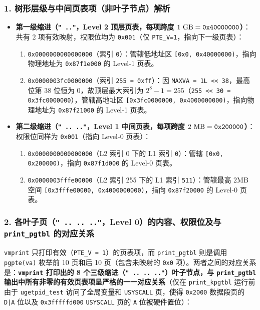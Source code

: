 \documentclass[12pt, a4paper]{ctexart}
\begin{document}
\subsubsection{1. 树形层级与中间页表项（非叶子节点）解析}
\begin{itemize}
    \item \textbf{第一级缩进（\texttt{" .."}，Level 2 顶层页表，每项跨度 $1\text{ GB} = \text{\texttt{0x40000000}}$）}：
    共有 2 项有效映射，权限位均为 \texttt{0x001}（仅 \texttt{PTE\_V=1}，指向下一级页表）：
    \begin{enumerate}
        \item \texttt{0x0000000000000000}（索引 \texttt{0}）：管辖低地址区 \texttt{[0x0, 0x40000000)}，指向物理地址为 \texttt{0x87f1e000} 的 Level-1 页表。
        \item \texttt{0x0000003fc0000000}（索引 \texttt{255 = 0xff}）：因 \texttt{MAXVA = 1L << 38}，最高位第 38 位恒为 0，故顶层最大索引为 $2^8 - 1 = 255$（\texttt{255 << 30 = 0x3fc0000000}），管辖高地址区 \texttt{[0x3fc0000000, 0x4000000000)}，指向物理地址为 \texttt{0x87f21000} 的 Level-1 页表。
    \end{enumerate}
    \item \textbf{第二级缩进（\texttt{" .. .."}，Level 1 中间页表，每项跨度 $2\text{ MB} = \text{\texttt{0x200000}}$）}：
    权限位同样为 \texttt{0x001}（指向 Level-0 页表）：
    \begin{enumerate}
        \item \texttt{0x0000000000000000}（L2 索引 0 下的 L1 索引 \texttt{0}）：管辖 \texttt{[0x0, 0x200000)}，指向 \texttt{0x87f1d000} 的 Level-0 页表。
        \item \texttt{0x0000003fffe00000}（L2 索引 255 下的 L1 索引 \texttt{511}）：管辖最高 2MB 空间 \texttt{[0x3fffe00000, 0x4000000000)}，指向 \texttt{0x87f20000} 的 Level-0 页表。
    \end{enumerate}
\end{itemize}

\subsubsection{2. 各叶子页（\texttt{" .. .. .."}，Level 0）的内容、权限位及与 \texttt{print\_pgtbl} 的对应关系}
\texttt{vmprint} 只打印有效（\texttt{PTE\_V = 1}）的页表项，而 \texttt{print\_pgtbl} 則是调用 \texttt{pgpte(va)} 枚举前 10 页和后 10 页（包含未映射的 \texttt{0x0} 项）。两者之间的对应关系是：\textbf{\texttt{vmprint} 打印出的 8 个三级缩进（\texttt{" .. .. .."}）叶子节点，与 \texttt{print\_pgtbl} 输出中所有非零的有效页表项呈严格的一一对应关系}（仅在 \texttt{print\_kpgtbl} 运行前由于 \texttt{ugetpid\_test} 访问了全局变量和 \texttt{USYSCALL} 页，使得 \texttt{0x2000} 数据段页的 \texttt{D|A} 位以及 \texttt{0x3fffffd000} \texttt{USYSCALL} 页的 \texttt{A} 位被硬件置位）：
\end{document}
